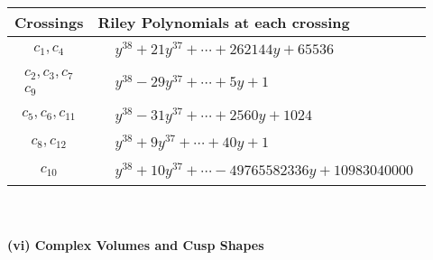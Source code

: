 \documentclass[1p]{elsarticle_modified}
\theoremstyle{definition}
\begin{document}
\begin{tabular}{m{50pt}|m{274pt}}
Crossings & \hspace{64pt}Riley Polynomials at each crossing \\
\hline $$\begin{aligned}c_{1},c_{4}\end{aligned}$$&$\begin{aligned}
&y^{38}+21 y^{37}+\cdots+262144 y+65536
\end{aligned}$\\
\hline $$\begin{aligned}c_{2},c_{3},c_{7}\\c_{9}\end{aligned}$$&$\begin{aligned}
&y^{38}-29 y^{37}+\cdots+5 y+1
\end{aligned}$\\
\hline $$\begin{aligned}c_{5},c_{6},c_{11}\end{aligned}$$&$\begin{aligned}
&y^{38}-31 y^{37}+\cdots+2560 y+1024
\end{aligned}$\\
\hline $$\begin{aligned}c_{8},c_{12}\end{aligned}$$&$\begin{aligned}
&y^{38}+9 y^{37}+\cdots+40 y+1
\end{aligned}$\\
\hline $$\begin{aligned}c_{10}\end{aligned}$$&$\begin{aligned}
&y^{38}+10 y^{37}+\cdots-49765582336 y+10983040000
\end{aligned}$\\
\hline
\end{tabular}\\~\\
\newpage\flushleft \textbf{(vi) Complex Volumes and Cusp Shapes}
\end{document}
